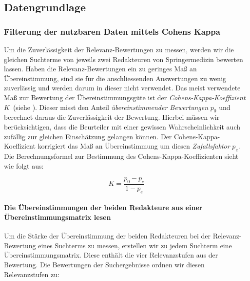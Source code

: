 \subsection{Datengrundlage}
\label{sec:Evaluation:Aufbau:Datengrundlage}

\subsubsection{Filterung der nutzbaren Daten mittels Cohens Kappa}
\label{sec:Evaluation:Aufbau:Datengrundlage:EvaluationsdatenFiltern}

Um die Zuverlässigkeit der Relevanz-Bewertungen zu messen, werden wir die gleichen Suchterme von jeweils zwei Redakteuren von Springermedizin bewerten lassen. Haben die Relevanz-Bewertungen ein zu geringes Maß an Übereinstimmung, sind sie für die anschliessenden Auswertungen zu wenig zuverlässig und werden darum in dieser nicht verwendet. Das meist verwendete Maß zur Bewertung der Übereinstimmungsgüte ist der \textit{Cohens-Kappa-Koeffizient} $K$~(siehe \cite{Kappa}). Dieser misst den Anteil \textit{übereinstimmender Bewertungen} $p_0$ und berechnet daraus die Zuverlässigkeit der Bewertung. Hierbei müssen wir berücksichtigen, dass die Beurteiler mit einer gewissen Wahrscheinlichkeit auch zufällig zur gleichen Einschätzung gelangen können. Der Cohens-Kappa-Koeffizient korrigiert das Maß an Übereinstimmung um diesen \textit{Zufallsfaktor} $p_e$. Die Berechnungsformel zur Bestimmung des Cohens-Kappa-Koeffizienten sieht wie folgt aus:

\vspace{-1.5em}
\begin{equation}	
	K = \frac{p_0 - p_e}{1 - p_e}
\end{equation}
\vspace{-1.5em}


\paragraph{Die Übereinstimmungen der beiden Redakteure aus einer Übereinstimmungsmatrix lesen}
Um die Stärke der Übereinstimmung der beiden Redakteuren bei der Relevanz-Bewertung eines Suchterms zu messen, erstellen wir zu jedem Suchterm eine Übereinstimmungsmatrix. Diese enthält die vier Relevanzstufen aus der Bewertung. Die Bewertungen der Suchergebnisse ordnen wir diesen Relevanzstufen zu:

